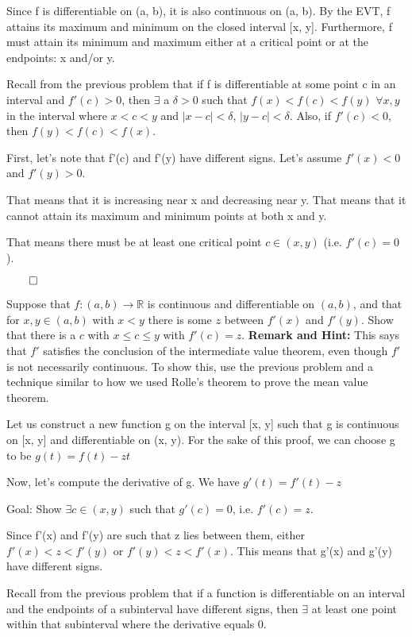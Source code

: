\documentclass[answers]{exam}
\theoremstyle{remark}
\theoremstyle{definition}
\newcommand{\RR}{\mathbb{R}}
\begin{document}
\begin{questions}
\begin{solution}
Since f is differentiable on (a, b), it is also continuous on (a, b).
By the EVT, f attains its maximum and minimum on the closed interval [x, y].
Furthermore, f must attain its minimum and maximum either at a critical point
or at the endpoints: x and/or y.

Recall from the previous problem that if f is differentiable at some point
c in an interval and $f'(c) > 0$, then $\exists$ a $\delta > 0$
such that $f(x) < f(c) < f(y)$ $\forall x, y$ in the interval
where $x < c < y$ and $|x-c| < \delta$, $|y-c| < \delta$.
Also, if $f'(c) < 0$, then $f(y) < f(c) < f(x)$.

First, let's note that f'(c) and f'(y) have different signs.
Let's assume $f'(x) < 0$ and $f'(y) > 0$.

That means that it is increasing near x and decreasing near y.
That means that it cannot attain its maximum and minimum points at both
x and y.

That means there must be at least one critical point $c \in (x, y)$
(i.e. $f'(c) = 0$).

$\qed$

\end{solution}

\question[4] Suppose that $f:(a,b) \to \RR$ is continuous and differentiable on $(a,b)$, and that for $x,y \in (a,b)$ with $x<y$  there is some $z$ between $f'(x)$ and $f'(y)$. Show that there is a $c$ with $x\le c \le y$ with $f'(c)=z$. \textbf{Remark and Hint:} This says that $f'$ satisfies the conclusion of the intermediate value theorem, even though $f'$ is not necessarily continuous. To show this, use the previous problem and a technique similar to how we used Rolle's theorem to prove the mean value theorem.
\begin{solution}

Let us construct a new function g on the interval [x, y]
such that g is continuous on [x, y] and differentiable
on (x, y). For the sake of this proof, we can choose g
to be $g(t) = f(t) - zt$

Now, let's compute the derivative of g.
We have $g'(t) = f'(t) - z$

Goal: Show $\exists c \in (x, y)$ such that $g'(c) = 0$,
i.e. $f'(c) = z$.

Since f'(x) and f'(y) are such that z lies between them,
either $f'(x) < z < f'(y)$ or $f'(y) < z < f'(x)$.
This means that g'(x) and g'(y) have different signs.

Recall from the previous problem that if a function is differentiable
on an interval and the endpoints of a subinterval have different signs,
then $\exists$ at least one point within that subinterval where the
derivative equals 0.


\end{solution}
\end{questions}
\end{document}
